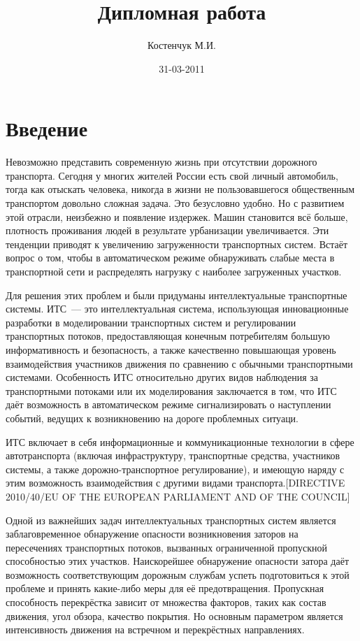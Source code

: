 \documentclass[a4paper,14pt]{article}
\title{Дипломная работа}
\author{Костенчук М.И.}
\date{31-03-2011}
\begin{document}
\maketitle

\tableofcontents
\newpage

\section{Введение}

Невозможно представить современную жизнь при отсутствии дорожного транспорта. Сегодня у многих жителей России есть свой личный автомобиль, тогда как отыскать человека, никогда в жизни не пользовавшегося общественным транспортом довольно сложная задача. Это безусловно удобно. Но с развитием этой отрасли, неизбежно и появление издержек. Машин становится всё больше, плотность проживания людей в результате урбанизации увеличивается. Эти тенденции приводят к увеличению загруженности транспортных систем. Встаёт вопрос о том, чтобы в автоматическом режиме обнаруживать слабые места в транспортной сети и распределять нагрузку с наиболее загруженных участков.

Для решения этих проблем и были придуманы интеллектуальные транспортные системы. ИТС~--- это интеллектуальная система, использующая инновационные разработки в моделировании транспортных систем и регулировании транспортных потоков, предоставляющая конечным потребителям большую информативность и безопасность, а также качественно повышающая уровень взаимодействия участников движения по сравнению с обычными транспортными системами. Особенность ИТС относительно других видов наблюдения за транспортными потоками или их моделирования заключается в том, что ИТС даёт возможность в автоматическом режиме сигнализировать о наступлении событий, ведущих к возникновению на дороге проблемных ситуаци.

ИТС включает в себя информационные и коммуникационные технологии в сфере автотранспорта (включая инфраструктуру, транспортные средства, участников системы, а также дорожно-транспортное регулирование), и имеющую наряду с этим возможность взаимодействия с другими видами транспорта.[DIRECTIVE 2010/40/EU OF THE EUROPEAN PARLIAMENT AND OF THE COUNCIL]

Одной из важнейших задач интеллектуальных транспортных систем является заблаговременное обнаружение опасности возникновения заторов на пересечениях транспортных потоков, вызванных ограниченной пропускной способностью этих участков. Наискорейшее обнаружение опасности затора даёт возможность соответствующим дорожным службам успеть подготовиться к этой проблеме и принять какие-либо меры для её предотвращения. Пропускная способность перекрёстка зависит от множества факторов, таких как состав движения, угол обзора, качество покрытия. Но основным параметром является интенсивность движения на встречном и перекрёстных направлениях.
\end{document}
